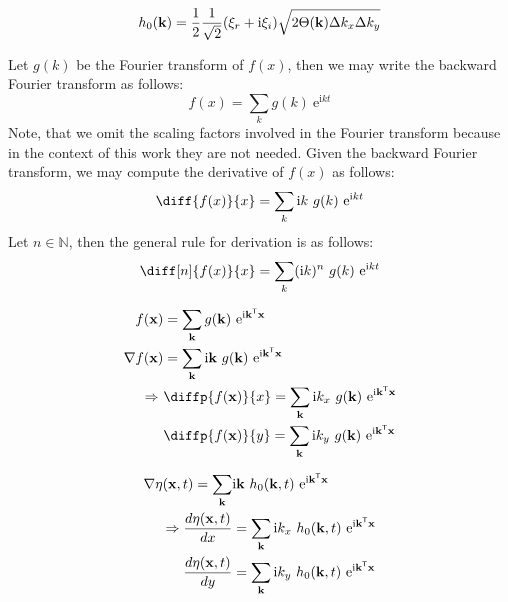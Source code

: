 \begin{equation}
h_0(\mathbf{k}) =
\frac{1}{2}
\frac{1}{\sqrt{2}}(\xi_r+\mathrm{i}\xi_i)
\sqrt{2\Theta(\mathbf{k})\Delta k_x \Delta k_y}
\end{equation}

Let $g(k)$ be the Fourier transform of $f(x)$, then we may write the
backward Fourier transform as follows:
\begin{equation}
 f(x) = \sum_{k}g(k)~\mathrm{e}^{\mathrm{i}kt}
\end{equation}
Note, that we omit the scaling factors involved in the Fourier transform
because in the context of this work they are not needed.
Given the backward Fourier transform, we may compute the derivative of $f(x)$
as follows:
\begin{equation}
  \diff{f(x)}{x} = \sum_{k}\mathrm{i}k~g(k)~\mathrm{e}^{\mathrm{i}kt}
\end{equation}
Let $n \in \mathbb{N}$, then the general rule for derivation is as follows:
\begin{equation}
  \diff[n]{f(x)}{x} = \sum_{k}(\mathrm{i}k)^n~g(k)~\mathrm{e}^{\mathrm{i}kt}
\end{equation}


\begin{align}
 f(\mvec{x}) &= \sum_{\mvec{k}}g(\mvec{k})~\mathrm{e}^{\mathrm{i}\transpose{\mvec{k}}\mvec{x}} \\
 \nabla f(\mvec{x}) &= \sum_{\mvec{k}}\mathrm{i}\mvec{k}~g(\mvec{k})~\mathrm{e}^{\mathrm{i}\transpose{\mvec{k}}\mvec{x}} \\
 \Rightarrow~&\diffp{f(\mvec{x})}{x} = \sum_{\mvec{k}}\mathrm{i}k_{x}~g(\mvec{k})~\mathrm{e}^{\mathrm{i}\transpose{\mvec{k}}\mvec{x}} \\
 &\diffp{f(\mvec{x})}{y} = \sum_{\mvec{k}}\mathrm{i}k_{y}~g(\mvec{k})~\mathrm{e}^{\mathrm{i}\transpose{\mvec{k}}\mvec{x}}
\end{align}

\begin{align}
\nabla\eta(\mathbf{x},t) =
\sum_{\mathbf{k}}&\mathrm{i}\mathbf{k}~h_0(\mathbf{k},t)
~\mathrm{e}^{\mathrm{i}\mathbf{k}^{\mathsf{T}}\mathbf{x}} \\
\Rightarrow \frac{d\eta(\mathbf{x},t)}{dx} &=
\sum_{\mathbf{k}}\mathrm{i}k_x~h_0(\mathbf{k},t)
~\mathrm{e}^{\mathrm{i}\mathbf{k}^{\mathsf{T}}\mathbf{x}} \\
\frac{d\eta(\mathbf{x},t)}{dy} &=
\sum_{\mathbf{k}}\mathrm{i}k_y~h_0(\mathbf{k},t)
~\mathrm{e}^{\mathrm{i}\mathbf{k}^{\mathsf{T}}\mathbf{x}}
\end{align}

